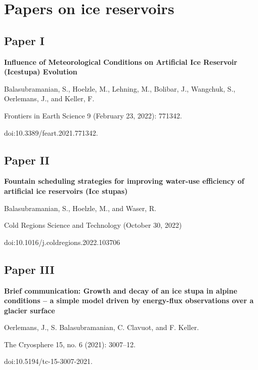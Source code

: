\pagestyle{empty}				%
\chapter{Papers on ice reservoirs}

\section{Paper I}
\vfil\null
\huge{\textbf{Influence of Meteorological Conditions on Artificial Ice Reservoir (Icestupa) Evolution}}

\bigskip
\large{Balasubramanian, S., Hoelzle, M., Lehning, M., Bolibar, J., Wangchuk, S.,
  Oerlemans, J., and Keller, F. \par  Frontiers in Earth Science 9 (February 23, 2022): 771342.\par
doi:10.3389/feart.2021.771342.}



\section{Paper II}
\vfil\null
\huge{\textbf{Fountain scheduling strategies for improving water-use efficiency of artificial ice reservoirs (Ice stupas)}}

\bigskip
\large{Balasubramanian, S., Hoelzle, M., and Waser, R. \par  Cold Regions Science and Technology (October 30,
2022) \par doi:10.1016/j.coldregions.2022.103706 }



\section{Paper III}
\vfil\null
\huge{\textbf{Brief communication: Growth and decay of an ice stupa in alpine conditions – a simple model driven by energy-flux observations over a glacier surface}}

\bigskip
\large{
Oerlemans, J., S. Balasubramanian, C. Clavuot, and F. Keller. \par The Cryosphere 15, no. 6 (2021): 3007–12.
\par doi:10.5194/tc-15-3007-2021.
  }




